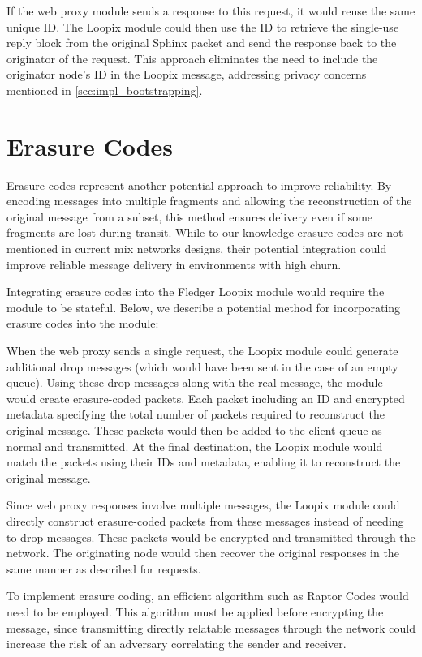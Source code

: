 \documentclass[a4paper,11pt,oneside]{report}
\begin{document}
If the web proxy module sends a response to this request, it would reuse the same unique ID. The Loopix module could then use the ID to retrieve the single-use reply block from the original Sphinx packet and send the response back to the originator of the request. This approach eliminates the need to include the originator node's ID in the Loopix message, addressing privacy concerns mentioned in \autoref{sec:impl_bootstrapping}.

\section{Erasure Codes}
Erasure codes represent another potential approach to improve reliability. By encoding messages into multiple fragments and allowing the reconstruction of the original message from a subset, this method ensures delivery even if some fragments are lost during transit. While to our knowledge erasure codes are not mentioned in current mix networks designs, their potential integration could improve reliable message delivery in environments with high churn.

Integrating erasure codes into the Fledger Loopix module would require the module to be stateful. Below, we describe a potential method for incorporating erasure codes into the module:

When the web proxy sends a single request, the Loopix module could generate additional drop messages (which would have been sent in the case of an empty queue). Using these drop messages along with the real message, the module would create erasure-coded packets. Each packet including an ID and encrypted metadata specifying the total number of packets required to reconstruct the original message. These packets would then be added to the client queue as normal and transmitted. At the final destination, the Loopix module would match the packets using their IDs and metadata, enabling it to reconstruct the original message.

Since web proxy responses involve multiple messages, the Loopix module could directly construct erasure-coded packets from these messages instead of needing to drop messages. These packets would be encrypted and transmitted through the network. The originating node would then recover the original responses in the same manner as described for requests.

To implement erasure coding, an efficient algorithm such as Raptor Codes \cite{raptor} would need to be employed. This algorithm must be applied before encrypting the message, since transmitting directly relatable messages through the network could increase the risk of an adversary correlating the sender and receiver.
\end{document}

